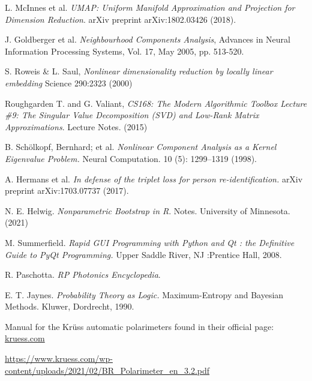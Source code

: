 \documentclass[11pt, a4paper, twoside]{article} %
\begin{document}
\begin{thebibliography}{1}
{
L. McInnes et al. {\em UMAP: Uniform Manifold Approximation and Projection for Dimension Reduction}. arXiv preprint arXiv:1802.03426 (2018).

J. Goldberger et al. {\em Neighbourhood Components Analysis}, Advances in Neural Information Processing Systems, Vol. 17, May 2005, pp. 513-520.

S. Roweis \& L. Saul, {\em Nonlinear dimensionality reduction by locally linear embedding} Science 290:2323 (2000)

Roughgarden T. and G. Valiant, {\em CS168: The Modern Algorithmic Toolbox Lecture \#9: The Singular Value Decomposition (SVD) and Low-Rank Matrix Approximations}. Lecture Notes. (2015)

B. Schölkopf, Bernhard; et al. {\em Nonlinear Component Analysis as a Kernel Eigenvalue Problem.} Neural Computation. 10 (5): 1299–1319 (1998).

A. Hermans et al. {\em In defense of the triplet loss for person re-identification.} arXiv preprint arXiv:1703.07737 (2017).

N. E. Helwig. {\em Nonparametric Bootstrap in R}. Notes. University of Minnesota. (2021)

M. Summerfield. {\em Rapid GUI Programming with Python and Qt : the Definitive Guide to PyQt Programming.} Upper Saddle River, NJ :Prentice Hall, 2008.

R. Paschotta. {\em RP Photonics Encyclopedia}.

E. T. Jaynes. {\em Probability Theory as Logic.} Maximum-Entropy and Bayesian Methods. Kluwer, Dordrecht, 1990.


Manual for the Krüss automatic polarimeters found in their official page:  \href{kruess.com}{kruess.com}

\href{https://www.kruess.com/wp-content/uploads/2021/02/BR_Polarimeter_en_3.2.pdf}{https://www.kruess.com/wp-content/uploads/2021/02/BR\_Polarimeter\_en\_3.2.pdf}
}
\end{thebibliography}
\end{document}
